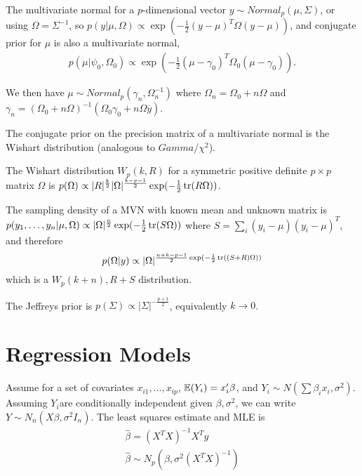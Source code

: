 \begin{defn}
  \label{sec:mult-distr-2}
  The multivariate normal for a $p$-dimensional vector $y \sim
  Normal_{p}(\mu, \Sigma)$, or using $\Omega = \Sigma^{-1}$, so $p(y |
  \mu, \Omega) \propto \exp(-\frac{1}{2} (y-\mu)^{T} \Omega (y -
  \mu))$, and conjugate prior for $\mu$ is also a multivariate normal,
  \begin{align}
    p(\mu | \psi_{0}, \Omega_{0}) \propto \exp(-\frac{1}{2} (\mu -
    \gamma_{0})^{T} \Omega_{0} (\mu - \gamma_{0})).\label{eq:3}    
  \end{align}
  

  We then have $\mu \sim Normal_{p}(\gamma_{n}, \Omega_{n}^{-1})$
  where $\Omega_{n} = \Omega_{0} + n \Omega$ and $\gamma_{n} =
  (\Omega_{0} + n \Omega)^{-1}(\Omega_{0} \gamma_{0} + n \Omega
  \overline y)$.
\end{defn}

\begin{defn}
  \label{sec:mult-distr-3}
  The conjugate prior on the precision matrix of a multivariate normal
  is the Wishart distribution (analogous to $Gamma$/$\chi^{2}$).

  The Wishart distribution $W_{p}(k, R)$ for a symmetric positive
  definite $p \times p$ matrix $\Omega$ is $p(\Omega) \propto
  |R|^{\frac{k}{2}} |\Omega|^{\frac{k-p-1}{2}} \exp (-\frac{1}{2}
  \operatorname*{tr}(R \Omega))$.

  The sampling density of a MVN with known mean and unknown matrix is
  $p(y_{1}, \dots, y_{n} | \mu, \Omega) \propto |\Omega|^{\frac{n}{2}}
  \exp(-\frac{1}{2} \operatorname*{tr}(S \Omega))$ where $S = \sum_{i}^{} (y_{i} -
  \mu)(y_{i} - \mu)^{T}$, and therefore
  \begin{equation}
    \label{eq:16}
    p(\Omega | y) \propto |\Omega|^{\frac{n+k-p-1}{2} \exp(-\frac{1}{2} \operatorname*{tr}((S+R)\Omega))}
  \end{equation} which is a $W_{p}(k+n), R+S$ distribution.

  The Jeffreys prior is $p(\Sigma) \propto |\Sigma|^{-\frac{p+1}{2}}$,
  equivalently $k \rightarrow 0$.
\end{defn}


\section{Regression Models}
\label{sec:regression-models}

Assume for a set of covariates $x_{i1}, \dots, x_{ip}$, $\E{Y_{i}} =
x_{i}' \beta$, and $Y_{i} \sim N(\sum \beta_{i} x_{i}, \sigma^{2})$.
Assuming $Y_{i}$are conditionally independent given $\beta,
\sigma^{2}$, we can write $Y \sim N_{n}(X \beta, \sigma^{2} I_{n})$.
The least squares estimate and MLE is
\begin{align}
  \label{eq:17}
  \hat \beta = (X^{T} X)^{-1} X^{T} y \\
  \label{eq:18}
  \hat \beta \sim N_{p}(\beta, \sigma^{2}(X^{T} X)^{-1})
\end{align}

